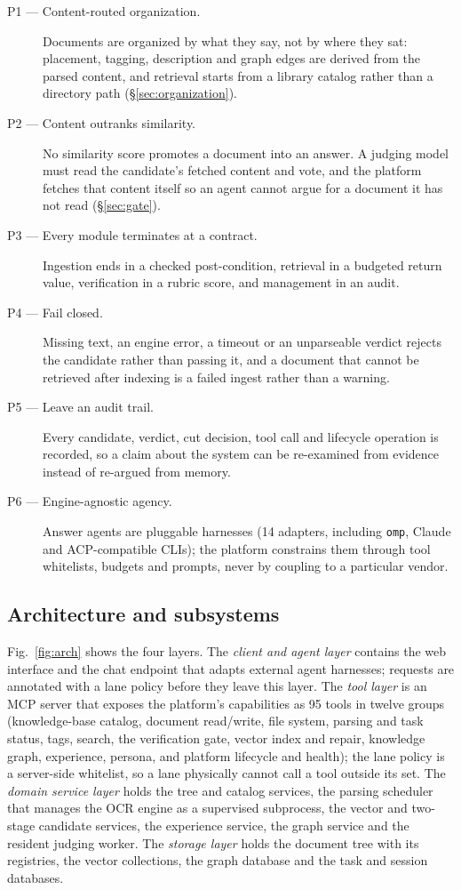 \begin{description}
\item[P1 --- Content-routed organization.] Documents are organized by what
they say, not by where they sat: placement, tagging, description and graph
edges are derived from the parsed content, and retrieval starts from a
library catalog rather than a directory path (\S\ref{sec:organization}).
\item[P2 --- Content outranks similarity.] No similarity score promotes a
document into an answer. A judging model must read the candidate's fetched
content and vote, and the platform fetches that content itself so an agent
cannot argue for a document it has not read (\S\ref{sec:gate}).
\item[P3 --- Every module terminates at a contract.] Ingestion ends in a
checked post-condition, retrieval in a budgeted return value, verification in
a rubric score, and management in an audit.
\item[P4 --- Fail closed.] Missing text, an engine error, a timeout or an
unparseable verdict rejects the candidate rather than passing it, and a
document that cannot be retrieved after indexing is a failed ingest rather
than a warning.
\item[P5 --- Leave an audit trail.] Every candidate, verdict, cut decision,
tool call and lifecycle operation is recorded, so a claim about the system
can be re-examined from evidence instead of re-argued from memory.
\item[P6 --- Engine-agnostic agency.] Answer agents are pluggable harnesses
(14 adapters, including \texttt{omp}, Claude and ACP-compatible CLIs); the
platform constrains them through tool whitelists, budgets and prompts, never
by coupling to a particular vendor.
\end{description}

\subsection{Architecture and subsystems}
\label{sec:architecture}

Fig.~\ref{fig:arch} shows the four layers. The \emph{client and agent layer}
contains the web interface and the chat endpoint that adapts external agent
harnesses; requests are annotated with a lane policy before they leave this
layer. The \emph{tool layer} is an MCP server that exposes the platform's
capabilities as 95 tools in twelve groups (knowledge-base catalog, document
read/write, file system, parsing and task status, tags, search, the
verification gate, vector index and repair, knowledge graph, experience,
persona, and platform lifecycle and health);
the lane policy is a server-side whitelist, so a lane physically cannot call
a tool outside its set. The \emph{domain service layer} holds the tree and
catalog services, the parsing scheduler that manages the OCR engine as a
supervised subprocess, the vector and two-stage candidate services, the
experience service, the graph service and the resident judging worker. The
\emph{storage layer} holds the document tree with its registries, the vector
collections, the graph database and the task and session databases.

